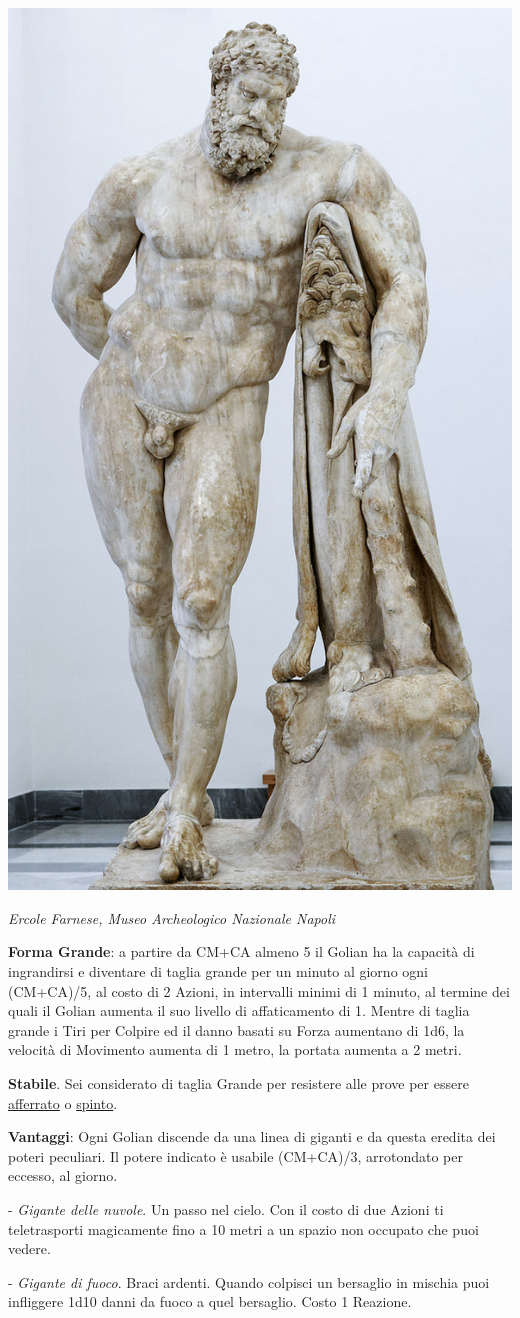\begin{multicols}{2}
\begin{center}
	\includegraphics[height=0.8\linewidth]{immagini/Herakles_Farnese_MAN_Napoli_Inv6001_n01.png}

	\medskip

	\emph{Ercole Farnese, Museo Archeologico Nazionale Napoli}

\end{center}

\textbf{Forma Grande}: a partire da CM+CA almeno 5 il Golian ha la capacità di ingrandirsi e diventare di taglia grande per un minuto al giorno ogni (CM+CA)/5, al costo di 2 Azioni, in intervalli minimi di 1 minuto, al termine dei quali il Golian aumenta il suo livello di affaticamento di 1. Mentre di taglia grande i Tiri per Colpire ed il danno basati su Forza aumentano di 1d6, la velocità di Movimento aumenta di 1 metro, la portata aumenta a 2 metri.

\textbf{Stabile}. Sei considerato di taglia Grande per resistere alle prove per essere \hyperlink{spingereavversario}{afferrato} o \hyperlink{spingereavversario}{spinto}.

\textbf{Vantaggi}: Ogni Golian discende da una linea di giganti e da questa eredita dei poteri peculiari. Il potere indicato è usabile (CM+CA)/3, arrotondato per eccesso, al giorno.

- \emph{Gigante delle nuvole}. Un passo nel cielo. Con il costo di due Azioni ti teletrasporti magicamente fino a 10 metri a un spazio non occupato che puoi vedere.

- \emph{Gigante di fuoco}. Braci ardenti. Quando colpisci un bersaglio in mischia puoi infliggere 1d10 danni da fuoco a quel bersaglio. Costo 1 Reazione.


\end{multicols}
